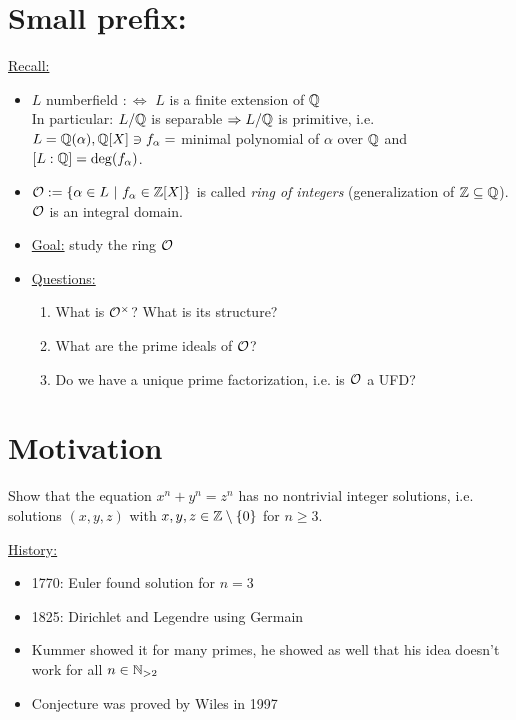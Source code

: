\section*{Small prefix:}
\underline{Recall:}
\begin{itemize}
\item $L$ numberfield $:\iff$ $L$ is a finite extension of $\mathbb{Q}$\\
In particular: $L / \mathbb{Q}$ is separable $\Rightarrow L/\mathbb{Q}$ is primitive, i.e. $L=\mathbb{Q}(\alpha), \mathbb{Q}[X] \ni f_\alpha=$ minimal polynomial of $\alpha$ over $\mathbb{Q}$ and $[L:\mathbb{Q}]=\deg(f_\alpha)$.
\item $\mathcal{O}:=\{\alpha \in L \ | \ f_\alpha \in \mathbb{Z}[X]\}$ is called \emph{ring of integers} (generalization of $\mathbb{Z} \subseteq \mathbb{Q}$).\\
$\mathcal{O}$ is an integral domain.
\item \underline{Goal:} study the ring $\mathcal{O}$
\item \underline{Questions:} \begin{enumerate}
\item What is $\mathcal{O}^\times$? What is its structure?
\item What are the prime ideals of $\mathcal{O}$?
\item Do we have a unique prime factorization, i.e. is $\mathcal{O}$ a UFD?
\end{enumerate}
\end{itemize}

\section{Motivation}
\begin{prob}
Show that the equation $x^n+y^n=z^n$ has no nontrivial integer solutions, i.e. solutions $(x,y,z)$ with $x,y,z \in \mathbb{Z}\setminus \{0\}$ for $n \geq 3$.
\end{prob}
\underline{History:} \begin{itemize}
\item 1770: Euler found solution for $n=3$
\item 1825: Dirichlet and Legendre using Germain 
\item Kummer showed it for many primes, he showed as well that his idea doesn't work for all $n \in \mathbb{N}_{>2}$
\item Conjecture was proved by Wiles in 1997
\end{itemize}


